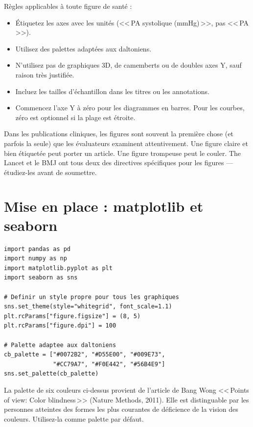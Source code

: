 R\`egles applicables \`a toute figure de sant\'e :
\begin{itemize}
  \item \'Etiquetez les axes avec les unit\'es (<<\,PA systolique (mmHg)\,>>, pas <<\,PA\,>>).
  \item Utilisez des palettes adapt\'ees aux daltoniens.
  \item N'utilisez pas de graphiques 3D, de camemberts ou de doubles axes Y, sauf raison tr\`es justifi\'ee.
  \item Incluez les tailles d'\'echantillon dans les titres ou les annotations.
  \item Commencez l'axe Y \`a z\'ero pour les diagrammes en barres. Pour les courbes, z\'ero est optionnel si la plage est \'etroite.
\end{itemize}

\begin{clinicalnote}
Dans les publications cliniques, les figures sont souvent la premi\`ere chose (et parfois la seule) que les \'evaluateurs examinent attentivement. Une figure claire et bien \'etiquet\'ee peut porter un article. Une figure trompeuse peut le couler. The Lancet et le BMJ ont tous deux des directives sp\'ecifiques pour les figures --- \'etudiez-les avant de soumettre.
\end{clinicalnote}

\section{Mise en place : matplotlib et seaborn}

\begin{verbatim}
import pandas as pd
import numpy as np
import matplotlib.pyplot as plt
import seaborn as sns

# Definir un style propre pour tous les graphiques
sns.set_theme(style="whitegrid", font_scale=1.1)
plt.rcParams["figure.figsize"] = (8, 5)
plt.rcParams["figure.dpi"] = 100

# Palette adaptee aux daltoniens
cb_palette = ["#0072B2", "#D55E00", "#009E73",
              "#CC79A7", "#F0E442", "#56B4E9"]
sns.set_palette(cb_palette)
\end{verbatim}

\begin{pythontip}
La palette de six couleurs ci-dessus provient de l'article de Bang Wong <<\,Points of view: Color blindness\,>> (Nature Methods, 2011). Elle est distinguable par les personnes atteintes des formes les plus courantes de d\'eficience de la vision des couleurs. Utilisez-la comme palette par d\'efaut.
\end{pythontip}

